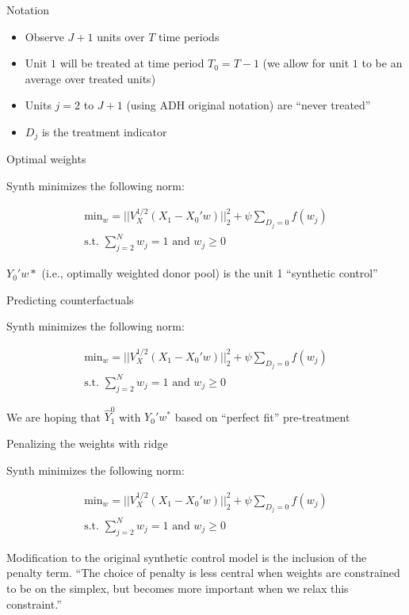 \documentclass{beamer}
\begin{document}
\begin{frame}{Notation}

\begin{itemize}
\item Observe $J+1$ units over $T$ time periods
\item Unit $1$ will be treated at time period $T_0=T-1$ (we allow for unit $1$ to be an average over treated units)
\item Units $j=2 $ to $J+1$ (using ADH original notation) are ``never treated''
\item $D_j$ is the treatment indicator
\end{itemize}

\end{frame}



\begin{frame}{Optimal weights}

Synth minimizes the following norm:

\begin{eqnarray*}
\textrm{min}_w = || V_X^{1/2} (X_1 - X_0'w) ||_2^2 + \psi \sum_{D_j=0}f(w_j)\\
\textrm{s.t. }\sum_{j=2}^N w_{j} =1 \textrm{ and } w_j \geq 0
\end{eqnarray*}

$Y_0'w*$ (i.e., optimally weighted donor pool) is the unit 1 ``synthetic control'' 

\end{frame}


\begin{frame}{Predicting counterfactuals}

Synth minimizes the following norm:

\begin{eqnarray*}
\textrm{min}_w = || V_X^{1/2} (X_1 - X_0'w) ||_2^2 + \psi \sum_{D_j=0}f(w_j)\\
\textrm{s.t. }\sum_{j=2}^N w_{j} =1 \textrm{ and } w_j \geq 0
\end{eqnarray*}

We are hoping that $\widehat{Y}_1^0$ with $Y_0' {w}^{*}$ based on ``perfect fit'' pre-treatment

\end{frame}




\begin{frame}{Penalizing the weights with ridge}

Synth minimizes the following norm:

\begin{eqnarray*}
\textrm{min}_w = || V_X^{1/2} (X_1 - X_0'w) ||_2^2 + \psi \sum_{D_j=0}f(w_j)\\
\textrm{s.t. }\sum_{j=2}^N w_{j} =1 \textrm{ and } w_j \geq 0
\end{eqnarray*}

Modification to the original synthetic control model is the inclusion of the penalty term. ``The choice of penalty is less central when weights are constrained to be on the simplex, but becomes more important when we relax this constraint.''

\end{frame}
\end{document}
